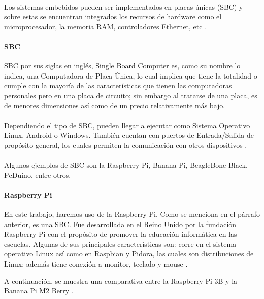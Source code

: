 \paragraph{}
Los sistemas embebidos pueden ser implementados en placas únicas (SBC) y sobre estas se encuentran integrados los recursos de hardware como el microprocesador, la memoria RAM, controladores Ethernet, etc \citep{MarcoTeorico14}.
\paragraph{SBC}
SBC por sus siglas en inglés, Single Board Computer es, como su nombre lo indica, una Computadora de Placa Única, lo cual implica que tiene la totalidad o cumple con la mayoría de las características que tienen las computadoras personales pero en una placa de circuito; sin embargo al tratarse de una placa, es de menores dimensiones así como de un precio relativamente más bajo.
\paragraph{}
Dependiendo el tipo de SBC, pueden llegar a ejecutar como Sistema Operativo Linux, Android o Windows. También cuentan con puertos de Entrada/Salida de propósito general, los cuales permiten la comunicación con otros dispositivos \citep{MarcoTeorico18}. 
\paragraph{}
Algunos ejemplos de SBC son la Raspberry Pi, Banana Pi, BeagleBone Black, PcDuino, entre otros.
\paragraph{Raspberry Pi}
En este trabajo, haremos uso de la Raspberry Pi. Como se menciona en el párrafo anterior, es una SBC. Fue desarrollada en el Reino Unido por la fundación Raspberry Pi con el propósito de promover la educación informática en las escuelas. Algunas de sus principales características son: corre en el sistema operativo Linux así como en Raspbian y Pidora, las cuales son distribuciones de Linux; además tiene conexión a monitor, teclado y mouse \citep{MarcoTeorico19}.   

A continuación, se muestra una comparativa entre la Raspberry Pi 3B y la Banana Pi M2 Berry \citep{MarcoTeorico21}\citep{MarcoTeorico22}.

